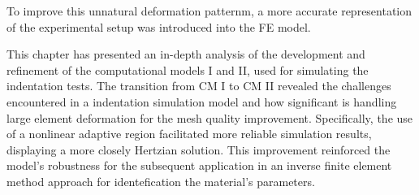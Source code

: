 To improve this unnatural deformation patternm, a more accurate representation of the 
experimental setup was introduced into the FE model. 



This chapter has presented an in-depth analysis of the development and refinement of the computational models I and II, used
for simulating the indentation tests. The transition from CM I to CM II revealed the challenges encountered in a indentation 
simulation model and how significant is handling large element deformation for the mesh quality improvement. 
Specifically, the use of a nonlinear adaptive region facilitated more reliable simulation results, displaying a more 
closely Hertzian solution. This improvement reinforced the model's robustness for the subsequent application in an inverse
finite element method approach for identefication the material's parameters.







